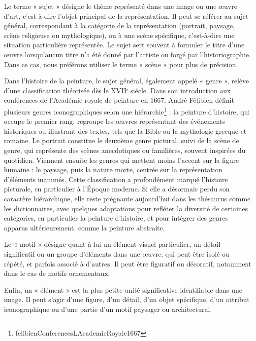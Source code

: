 Le terme « sujet » désigne le thème représenté dans une image ou une œuvre d’art, c’est-à-dire l’objet principal de la représentation. Il peut se référer au sujet général, correspondant à la catégorie de la représentation (portrait, paysage, scène religieuse ou mythologique), ou à une scène spécifique, c’est-à-dire une situation particulière représentée. Le sujet sert souvent à formuler le titre d’une œuvre lorsqu’aucun titre n’a été donné par l’artiste ou forgé par l’historiographie. Dans ce cas, nous préférons utiliser le terme « scène » pour plus de précision.

Dans l’histoire de la peinture, le sujet général, également appelé « genre », relève d’une classification théorisée dès le XVIIᵉ siècle. Dans son introduction aux conférences de l’Académie royale de peinture en 1667, André Félibien définit plusieurs genres iconographiques selon une hiérarchie\footnote{felibienConferencesLAcademieRoyale1667} : la peinture d’histoire, qui occupe le premier rang, regroupe les œuvres représentant des événements historiques ou illustrant des textes, tels que la Bible ou la mythologie grecque et romaine. Le portrait constitue le deuxième genre pictural, suivi de la scène de genre, qui représente des scènes anecdotiques ou familières, souvent inspirées du quotidien. Viennent ensuite les genres qui mettent moins l’accent sur la figure humaine : le paysage, puis la nature morte, centrée sur la représentation d’éléments inanimés. Cette classification a profondément marqué l’histoire picturale, en particulier à l’Époque moderne. Si elle a désormais perdu son caractère hiérarchique, elle reste prégnante aujourd’hui dans les thésaurus comme les dictionnaires, avec quelques adaptations pour refléter la diversité de certaines catégories, en particulier la peinture d’histoire, et pour intégrer des genres apparus ultérieurement, comme la peinture abstraite.

Le « motif » désigne quant à lui un élément visuel particulier, un détail significatif ou un groupe d’éléments dans une œuvre, qui peut être isolé ou répété, et parfois associé à d’autres. Il peut être figuratif ou décoratif, notamment dans le cas de motifs ornementaux. 

Enfin, un « élément » est la plus petite unité significative identifiable dans une image. Il peut s’agir d’une figure, d’un détail, d’un objet spécifique, d’un attribut iconographique ou d’une partie d’un motif paysager ou architectural.

